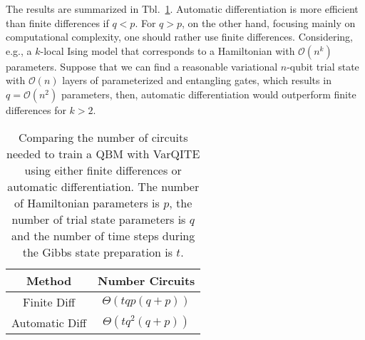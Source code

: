 \documentclass[twocolumn, aps, pra, superscriptaddress, floatfix]{revtex4}
\begin{document}
The results are summarized in Tbl.~\ref{tbl:complexity}.
Automatic differentiation is more efficient than finite differences if $q < p$. For $q > p$, on the other hand, focusing mainly on computational complexity, one should rather use finite differences. 
Considering, e.g., a $k$-local Ising model that corresponds to a Hamiltonian with $\mathcal{O}\left(n^k\right)$ parameters. Suppose that we can find a reasonable variational $n$-qubit trial state with $\mathcal{O}\left(n\right)$ layers of parameterized and entangling gates, which results in $q = \mathcal{O}\left(n^2\right)$ parameters, then, automatic differentiation would outperform finite differences for $k>2$.

\begin{table}[h!]
\captionsetup{singlelinecheck = false, format= hang, justification=raggedright, font=footnotesize, labelsep=space}
{\renewcommand{\arraystretch}{1.2}
\begin{tabular}{ c | c }
Method & Number Circuits \\ 
\hline
Finite Diff &  $\Theta\left(tqp(q+p)\right)$\\
Automatic Diff   & $\Theta\left(tq^2(q+p)\right)$\\
\end{tabular}
}
\caption{Comparing the number of circuits needed to train a QBM with VarQITE using either finite differences or automatic differentiation. The number of Hamiltonian parameters is $p$, the number of trial state parameters is $q$ and the number of time steps during the Gibbs state preparation is $t$.}
\label{tbl:complexity}
\end{table}



\end{document}
